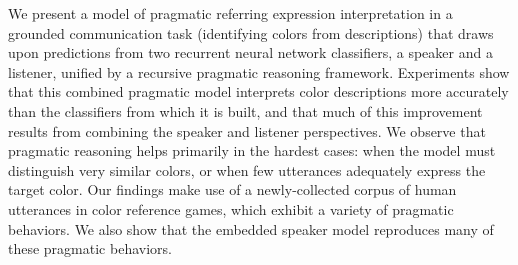 We present a model of pragmatic referring expression interpretation in a grounded communication task (identifying colors from descriptions) that draws upon predictions from two recurrent neural network classifiers, a speaker and a listener, unified by a recursive pragmatic reasoning framework. Experiments show that this combined pragmatic model interprets color descriptions more accurately than the classifiers from which it is built, and that much of this improvement results from combining the speaker and listener perspectives. We observe that pragmatic reasoning helps primarily in the hardest cases: when the model must distinguish very similar colors, or when few utterances adequately express the target color. Our findings make use of a newly-collected corpus of human utterances in color reference games, which exhibit a variety of pragmatic behaviors. We also show that the embedded speaker model reproduces many of these pragmatic behaviors.
